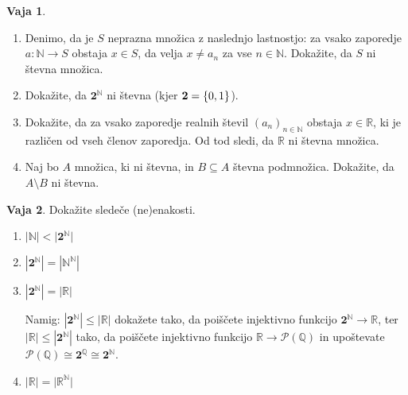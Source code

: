 \documentclass{article}
\newcommand{\pow}{\mathcal{P}}
\newcommand{\NN}{\mathbb{N}}
\newcommand{\QQ}{\mathbb{Q}}
\newcommand{\RR}{\mathbb{R}}
\newcommand{\two}{\mathtt{\mathbf{2}}}
\theoremstyle{definition}
\newtheorem{vaja}{Vaja}
\begin{document}
\begin{vaja}
  \
  \begin{enumerate}
    \item
      Denimo, da je $S$ neprazna množica z naslednjo lastnostjo: za vsako zaporedje $a\colon \NN \to S$ obstaja $x \in S$, da velja $x \neq a_n$ za vse $n \in \NN$. Dokažite, da $S$ ni števna množica.
    \item
      Dokažite, da $\two^\NN$ ni števna (kjer $\two = \set{0,1}$).
    \item
      Dokažite, da za vsako zaporedje realnih števil $(a_n)_{n \in \NN}$ obstaja $x \in \RR$, ki je različen od vseh členov zaporedja. Od tod sledi, da $\RR$ ni števna množica.
    \item
      Naj bo $A$ množica, ki ni števna, in $B \subseteq A$ števna podmnožica. Dokažite, da $A \setminus B$ ni števna.
  \end{enumerate}
\end{vaja}

\begin{vaja}
  Dokažite sledeče (ne)enakosti.
  \begin{enumerate}
    \item
      $|\NN| < \big|\two^\NN\big|$
    \item
      $|\two^\NN| = |\NN^\NN|$
    \item
      $|\two^\NN| = |\RR|$
      
      \smallskip
      {\small Namig: $|\two^\NN| \leq |\RR|$ dokažete tako, da poiščete injektivno funkcijo $\two^\NN \to \RR$, ter $|\RR| \leq |\two^\NN|$ tako, da poiščete injektivno funkcijo $\RR \to \pow(\QQ)$ in upoštevate $\pow(\QQ) \cong \two^\QQ \cong \two^\NN$.}
    \item
      $|\RR| = \big|\RR^\NN\big|$
  \end{enumerate}
\end{vaja}
\end{document}
